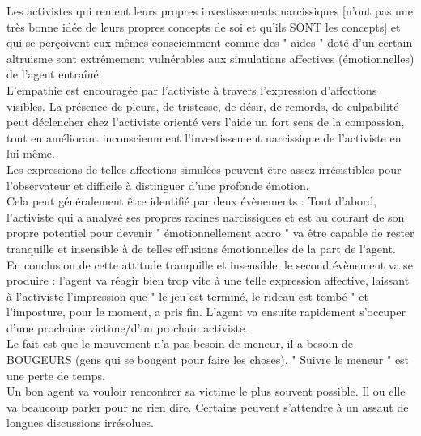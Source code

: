 \documentclass[11pt,twoside,a4paper]{article}
\begin{document}
Les activistes qui renient leurs propres investissements narcissiques [n'ont pas une tr{\`e}s bonne id{\'e}e de leurs propres concepts de soi et qu'ils SONT les concepts] et qui se per\c{c}oivent eux-m{\^e}mes consciemment comme des " aides " dot{\'e} d'un certain altruisme sont extr{\^e}mement vuln{\'e}rables aux simulations affectives ({\'e}motionnelles) de l'agent entra{\^i}n{\'e}.~\\

L'empathie est encourag{\'e}e par l'activiste {\`a} travers l'expression d'affections visibles. La pr{\'e}sence de pleurs, de tristesse, de d{\'e}sir, de remords, de culpabilit{\'e} peut d{\'e}clencher chez l'activiste orient{\'e} vers l'aide un fort sens de la compassion, tout en am{\'e}liorant inconsciemment l'investissement narcissique de l'activiste en lui-m{\^e}me.~\\

Les expressions de telles affections simul{\'e}es peuvent {\^e}tre assez irr{\'e}sistibles pour l'observateur et difficile {\`a} distinguer d'une profonde {\'e}motion.~\\

Cela peut g{\'e}n{\'e}ralement {\^e}tre identifi{\'e} par deux {\'e}v{\`e}nements : Tout d'abord, l'activiste qui a analys{\'e} ses propres racines narcissiques et est au courant de son propre potentiel pour devenir " {\'e}motionnellement accro " va {\^e}tre capable de rester tranquille et insensible {\`a} de telles effusions {\'e}motionnelles de la part de l'agent.~\\

En conclusion de cette attitude tranquille et insensible, le second {\'e}v{\`e}nement va se produire : l'agent va r{\'e}agir bien trop vite {\`a} une telle expression affective, laissant {\`a} l'activiste l'impression que " le jeu est termin{\'e}, le rideau est tomb{\'e} " et l'imposture, pour le moment, a pris fin. L'agent va ensuite rapidement s'occuper d'une prochaine victime/d'un prochain activiste.~\\

Le fait est que le mouvement n'a pas besoin de meneur, il a besoin de BOUGEURS (gens qui se bougent pour faire les choses). " Suivre le meneur " est une perte de temps.~\\

Un bon agent va vouloir rencontrer sa victime le plus souvent possible. Il ou elle va beaucoup parler pour ne rien dire. Certains peuvent s'attendre {\`a} un assaut de longues discussions irr{\'e}solues.~\\
\end{document}
